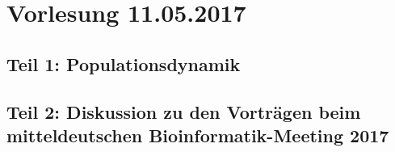\section{Vorlesung 11.05.2017}

\subsection{Teil 1: Populationsdynamik}

\subsection{Teil 2: Diskussion zu den Vorträgen beim mitteldeutschen Bioinformatik-Meeting 2017}